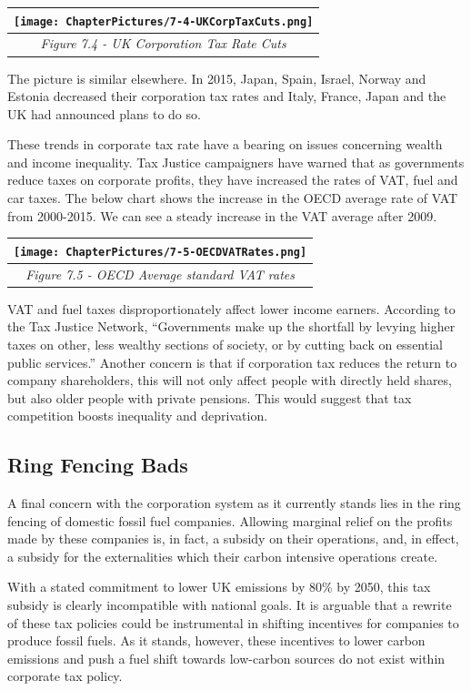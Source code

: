 \documentclass[]{tufte-handout}
\begin{document}
\begin{longtable}[]{@{}c@{}}
\toprule
\texttt{[image: ChapterPictures/7-4-UKCorpTaxCuts.png]}\tabularnewline
\midrule
\endhead
\emph{Figure 7.4 - UK Corporation Tax Rate Cuts}\tabularnewline
\bottomrule
\end{longtable}

The picture is similar elsewhere. In 2015, Japan, Spain, Israel, Norway
and Estonia decreased their corporation tax rates and Italy, France,
Japan and the UK had announced plans to do so.

These trends in corporate tax rate have a bearing on issues concerning
wealth and income inequality. Tax Justice campaigners have warned that
as governments reduce taxes on corporate profits, they have increased
the rates of VAT, fuel and car taxes. The below chart shows the increase
in the OECD average rate of VAT from 2000-2015. We can see a steady
increase in the VAT average after 2009.

\begin{longtable}[]{@{}c@{}}
\toprule
\texttt{[image: ChapterPictures/7-5-OECDVATRates.png]}\tabularnewline
\midrule
\endhead
\emph{Figure 7.5 - OECD Average standard VAT rates}\tabularnewline
\bottomrule
\end{longtable}

VAT and fuel taxes disproportionately affect lower income earners.
According to the Tax Justice Network, ``Governments make up the
shortfall by levying higher taxes on other, less wealthy sections of
society, or by cutting back on essential public services.'' Another
concern is that if corporation tax reduces the return to company
shareholders, this will not only affect people with directly held
shares, but also older people with private pensions. This would suggest
that tax competition boosts inequality and deprivation.

\hypertarget{ring-fencing-bads}{%
\subsection{Ring Fencing Bads}\label{ring-fencing-bads}}

A final concern with the corporation system as it currently stands lies
in the ring fencing of domestic fossil fuel companies. Allowing marginal
relief on the profits made by these companies is, in fact, a subsidy on
their operations, and, in effect, a subsidy for the externalities which
their carbon intensive operations create.

With a stated commitment to lower UK emissions by 80\% by 2050, this tax
subsidy is clearly incompatible with national goals. It is arguable that
a rewrite of these tax policies could be instrumental in shifting
incentives for companies to produce fossil fuels. As it stands, however,
these incentives to lower carbon emissions and push a fuel shift towards
low-carbon sources do not exist within corporate tax policy.
\end{document}
